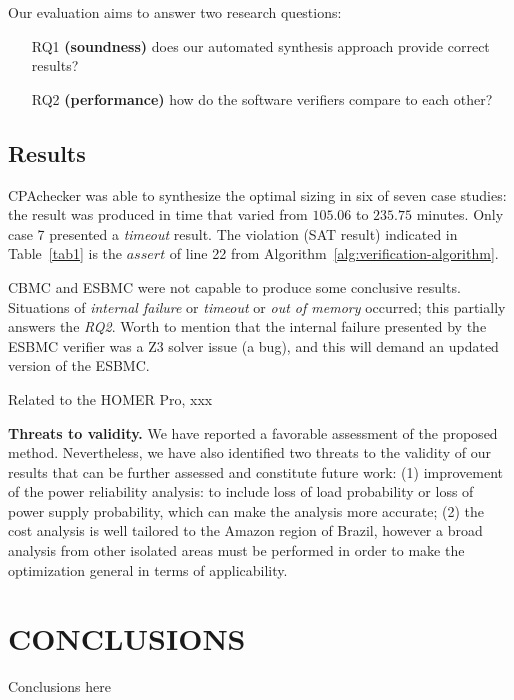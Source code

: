 \documentclass[review]{elsarticle}
\begin{document}
Our evaluation aims to answer two research questions: 

\begin{enumerate}

\item[RQ1] \textbf{(soundness)} does our automated synthesis approach provide correct results?

\item[RQ2] \textbf{(performance)} how do the software verifiers compare to each other?

\end{enumerate}

\subsection{Results}  

CPAchecker was able to synthesize the optimal sizing in six of seven case studies: the result was produced in time that varied from $105.06$ to $235.75$ minutes. Only case 7 presented a \textit{timeout} result.
The violation (SAT result) indicated in Table~\ref{tab1} is the $assert$ of line 22 from Algorithm~\ref{alg:verification-algorithm}. %

CBMC and ESBMC were not capable to produce some conclusive results. Situations of \textit{internal failure} or \textit{timeout} or \textit{out of memory} occurred; this partially answers the \textit{RQ2}. Worth to mention that the internal failure presented by the ESBMC verifier was a Z3 solver issue (a bug), and this will demand an updated version of the ESBMC.

Related to the HOMER Pro, xxx

\textbf{Threats to validity.}  We have reported a favorable assessment of the proposed method. Nevertheless, we have also identified two threats to the validity of our results that can be further assessed and constitute future work: (1) improvement of the power reliability analysis: to include loss of load probability or loss of power supply probability, which can make the analysis more accurate; (2) the cost analysis is well tailored to the Amazon region of Brazil, however a broad analysis from other isolated areas must be performed in order to make the optimization general in terms of applicability.

\section{CONCLUSIONS}
Conclusions here
\label{sec:Conclusion}
%
{}
\end{document}
